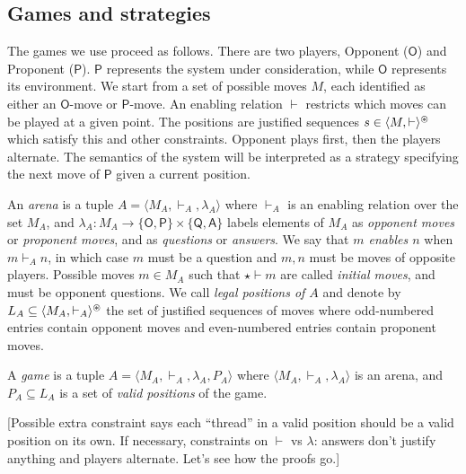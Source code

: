 \documentclass[acmsmall,anonymous]{acmart}
\newcommand{\kw}[1]{\ensuremath{ \textsf{#1} }}
\begin{document}

\subsection{Games and strategies} %

The games we use proceed as follows.
There are two players,
Opponent (\kw{O}) and Proponent (\kw{P}).
\kw{P} represents the system under consideration,
while \kw{O} represents its environment.
We start from a set of possible moves $M$,
each identified as either an \kw{O}-move or \kw{P}-move.
An enabling relation $\vdash$ restricts which moves
can be played at a given point.
The positions are justified sequences $s \in \langle M, \vdash \rangle^\oast$
which satisfy this and other constraints.
Opponent plays first, then the players alternate.
The semantics of the system will be interpreted as a strategy
specifying the next move of \kw{P}
given a current position.

\begin{definition}[Game]
An \emph{arena} is a tuple $A = \langle M_A, \vdash_A, \lambda_A \rangle$
where $\vdash_A$ is an enabling relation over the set $M_A$, and
$\lambda_A : M_A \rightarrow \{\kw{O},\kw{P}\} \times \{\kw{Q},\kw{A}\}$
labels elements of $M_A$ as \emph{opponent moves} or \emph{proponent moves},
and as \emph{questions} or \emph{answers}.
We say that \emph{$m$ enables $n$} when $m \vdash_A n$,
in which case $m$ must be a question
and $m, n$ must be moves of opposite players.
Possible moves $m \in M_A$ such that $\star \vdash m$
are called \emph{initial moves},
and must be opponent questions.
We call \emph{legal positions of $A$}
and denote by $L_A \subseteq \langle M_A, \vdash_A \rangle^\oast$
the set of justified sequences of moves
where odd-numbered entries contain opponent moves and
even-numbered entries contain proponent moves.

A \emph{game} is a tuple $A = \langle M_A, \vdash_A, \lambda_A, P_A \rangle$
where $\langle M_A, \vdash_A, \lambda_A \rangle$ is an arena,
and $P_A \subseteq L_A$ is a set of \emph{valid positions} of the game.
\end{definition}

[Possible extra constraint says each ``thread''
in a valid position should be a valid position on its own.
If necessary, constraints on $\vdash$ vs $\lambda$:
answers don't justify anything and players alternate.
Let's see how the proofs go.]

\end{document}
